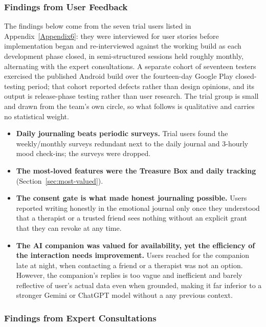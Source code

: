 \subsubsection{Findings from User Feedback}

The findings below come from the seven trial users listed in Appendix~\ref{Appendix6}: they were interviewed for user stories before implementation began and re-interviewed against the working build as each development phase closed, in semi-structured sessions held roughly monthly, alternating with the expert consultations. A separate cohort of seventeen testers exercised the published Android build over the fourteen-day Google Play closed-testing period; that cohort reported defects rather than design opinions, and its output is release-phase testing rather than user research. The trial group is small and drawn from the team's own circle, so what follows is qualitative and carries no statistical weight.

\begin{itemize}
\item \textbf{Daily journaling beats periodic surveys.} Trial users found the weekly/monthly surveys redundant next to the daily journal and 3-hourly mood check-ins; the surveys were dropped.
\item \textbf{The most-loved features were the Treasure Box and daily tracking} (Section~\ref{sec:most-valued}).
\item \textbf{The consent gate is what made honest journaling possible.} Users reported writing honestly in the emotional journal only once they understood that a therapist or a trusted friend sees nothing without an explicit grant that they can revoke at any time. 
\item \textbf{The AI companion was valued for availability, yet the efficiency of the interaction needs improvement.} Users reached for the companion late at night, when contacting a friend or a therapist was not an option. However, the companion's replies is too vague and inefficient and barely reflective of user's actual data even when grounded, making it far inferior to a stronger Gemini or ChatGPT model without a any previous context. 
\end{itemize}

\subsubsection{Findings from Expert Consultations}

